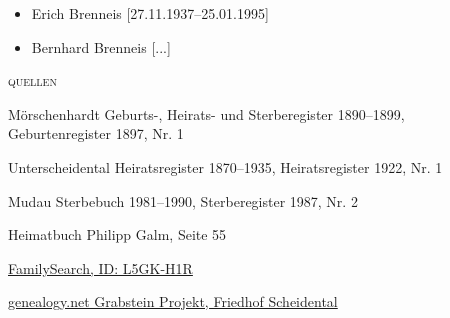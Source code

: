 \begin{person}[
    surname = {Schüßler},
    givenname = {Helena},
    suffix = {1897--1987},
    label = {@I176@},
    filename = {Helena Schuessler (1897)}
    ]
\begin{itemize}
\item Erich Brenneis [27.11.1937--25.01.1995]
\item Bernhard Brenneis [...]
\end{itemize}
\medbreak
\textsc{{quellen}}
\begin{enumerate}[label={[\arabic*]}]
\item Mörschenhardt Geburts-, Heirats- und Sterberegister 1890–1899, Geburtenregister 1897, Nr. 1
\item Unterscheidental Heiratsregister 1870–1935, Heiratsregister 1922, Nr. 1
\item Mudau Sterbebuch 1981–1990, Sterberegister 1987, Nr. 2
\item Heimatbuch Philipp Galm, Seite 55
\item \href{https://www.familysearch.org/tree/person/details/L5GK-H1R}{FamilySearch, ID: L5GK-H1R}
\item \href{http://grabsteine.genealogy.net/tomb.php?cem=3815&tomb=98&b=&lang=de}{genealogy.net Grabstein Projekt, Friedhof Scheidental}
\end{enumerate}

\end{person}

